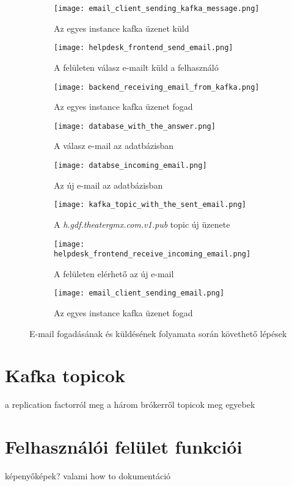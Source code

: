 \begin{figure}
	\begin{subfigure}{.49\textwidth}
		\centering
		\texttt{[image: email\_client\_sending\_kafka\_message.png]}  
		\caption{Az egyes instance kafka üzenet küld}
		\label{fig:email_client_send_kafka}
	\end{subfigure}
	\begin{subfigure}{.49\textwidth}
		\centering
		\texttt{[image: helpdesk\_frontend\_send\_email.png]}  
		\caption{A felületen válasz e-mailt küld a felhasználó}
		\label{fig:frontend_send_answer}
	\end{subfigure}
	
	\quad
	
	\begin{subfigure}{.49\textwidth}
		\centering
		\texttt{[image: backend\_receiving\_email\_from\_kafka.png]}  
		\caption{Az egyes instance kafka üzenet fogad}
		\label{fig:backend_receive_kafka}
	\end{subfigure}
	\begin{subfigure}{.49\textwidth}
		\centering
		\texttt{[image: database\_with\_the\_answer.png]}  
		\caption{A válasz e-mail az adatbázisban}
		\label{fig:database_answer}
	\end{subfigure}

	\quad

\begin{subfigure}{.49\textwidth}
	\centering
	\texttt{[image: databse\_incoming\_email.png]}  
	\caption{Az új e-mail az adatbázisban}
	\label{fig:datbase_received_email}
\end{subfigure}
\begin{subfigure}{.49\textwidth}
	\centering
	\texttt{[image: kafka\_topic\_with\_the\_sent\_email.png]}  
	\caption{A \textit{h.gdf.theater\textunderscore gmx.com.v1.pub} topic új üzenete}
	\label{fig:kafka_topic_send_email}
\end{subfigure}

	\quad

\begin{subfigure}{.45\textwidth}
	\centering
	\texttt{[image: helpdesk\_frontend\_receive\_incoming\_email.png]}  
	\caption{A felületen elérhető az új e-mail}
	\label{fig:frontend_read_email}
\end{subfigure}
\begin{subfigure}{.45\textwidth}
	\centering
	\texttt{[image: email\_client\_sending\_email.png]}  
	\caption{Az egyes instance kafka üzenet fogad}
	\label{fig:email_client_receives_kafka}
\end{subfigure}

	\caption{E-mail fogadásának és küldésének folyamata során követhető lépések}
	\label{fig:email_send_receive_visible}
\end{figure}


\section{Kafka topicok}
a replication factorról meg a három brókerről
topicok meg egyebek


\section{Felhasználói felület funkciói}
 képenyőképek? valami how to dokumentáció	
